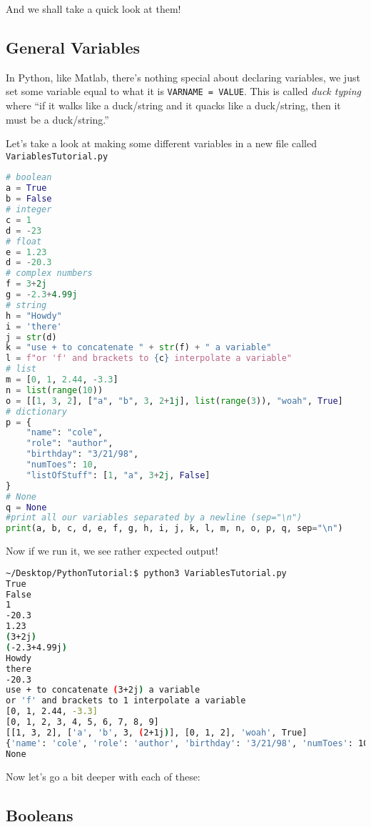 \documentclass[11pt, twoside, reqno]{book}
\begin{document}
And we shall take a quick look at them!

\subsection{General Variables}

In Python, like Matlab, there's nothing special about declaring variables, we just set some variable equal to what it is \texttt{VARNAME = VALUE}. This is called \textit{duck typing} where ``if it walks like a duck/string and it quacks like a duck/string, then it must be a duck/string.''

Let's take a look at making some different variables in a new file called \texttt{VariablesTutorial.py}
\begin{lstlisting}[language=Python]
# boolean
a = True
b = False
# integer
c = 1
d = -23
# float
e = 1.23
d = -20.3
# complex numbers
f = 3+2j
g = -2.3+4.99j
# string
h = "Howdy"
i = 'there'
j = str(d)
k = "use + to concatenate " + str(f) + " a variable"
l = f"or 'f' and brackets to {c} interpolate a variable"
# list
m = [0, 1, 2.44, -3.3]
n = list(range(10))
o = [[1, 3, 2], ["a", "b", 3, 2+1j], list(range(3)), "woah", True]
# dictionary
p = {
    "name": "cole",
    "role": "author",
    "birthday": "3/21/98",
    "numToes": 10,
    "listOfStuff": [1, "a", 3+2j, False]
}
# None
q = None
#print all our variables separated by a newline (sep="\n")
print(a, b, c, d, e, f, g, h, i, j, k, l, m, n, o, p, q, sep="\n")
\end{lstlisting}

Now if we run it, we see rather expected output!
\begin{lstlisting}[language=sh]
~/Desktop/PythonTutorial:$ python3 VariablesTutorial.py
True
False
1
-20.3
1.23
(3+2j)
(-2.3+4.99j)
Howdy
there
-20.3
use + to concatenate (3+2j) a variable
or 'f' and brackets to 1 interpolate a variable
[0, 1, 2.44, -3.3]
[0, 1, 2, 3, 4, 5, 6, 7, 8, 9]
[[1, 3, 2], ['a', 'b', 3, (2+1j)], [0, 1, 2], 'woah', True]
{'name': 'cole', 'role': 'author', 'birthday': '3/21/98', 'numToes': 10, 'listOfStuff': [1, 'a', (3+2j), False]}
None
\end{lstlisting}

Now let's go a bit deeper with each of these:

\subsection{Booleans}
\end{document}
